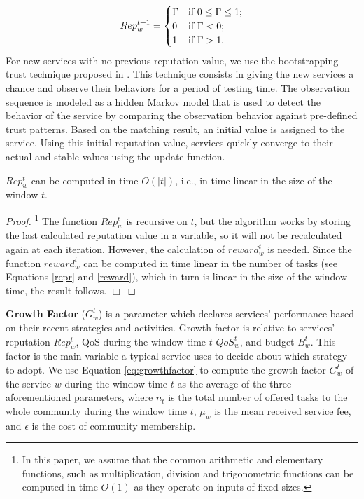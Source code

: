 \begin{equation}\label{repz}
Rep_{w}^{t+1} = \begin{cases}

\Gamma & \text{if $ 0 \leq \Gamma \leq 1$;}\\
0  & \text{if $\Gamma < 0$;}\\
1 & \text{if $\Gamma > 1$.}\\
\end{cases}
\end{equation}
%
For new services with no previous reputation value, we use the
bootstrapping trust technique proposed in \cite{DBLP:conf/icwe/YahyaouiZ11}. This
technique consists in giving the new services a chance and observe
their behaviors for a period of testing time. The observation
sequence is modeled as a hidden Markov model that is used to
detect the behavior of the service by comparing the observation
behavior against pre-defined trust patterns. Based on the matching
result, an initial value is assigned to the service. Using this
initial reputation value, services quickly converge to their
actual and stable values using the update function.

\begin{proposition}\label{Complexity-Rep}
$Rep_{w}^{t}$ can be computed in time $O(|t|)$, i.e., in time
linear in the size of the window $t$.
\end{proposition}

\begin{proof}\footnote{In this paper, we
assume that the common arithmetic and elementary functions, such
as multiplication, division and trigonometric functions can be
computed in time $O(1)$ as they operate on inputs of fixed sizes.}
The function $Rep_{w}^{t}$ is recursive on $t$, but the algorithm
works by storing the last calculated reputation value in a
variable, so it will not be recalculated again at each iteration.
However, the calculation of $reward_w^t$ is needed. Since the
function $reward_w^t$ can be computed in time linear in the number
of tasks (see Equations \ref{repr} and \ref{reward}), which in
turn is linear in the size of the window time, the result follows.
$\Box$
\end{proof}

\textbf{Growth Factor} ($G_w^t$) is a parameter which declares
services' performance based on their recent strategies and
activities. Growth factor is relative to services' reputation
$Rep_w^t$, QoS during the window time $t$ $QoS_w^t$, and budget
$B_w^t$. This factor is the main variable a typical service uses
to decide about which strategy to adopt. We use Equation \ref{eq:growthfactor} to compute the
growth factor $G^t_w$ of the service $w$ during the window time
$t$ as the average of the three aforementioned parameters, where
$n_t$ is the total number of offered tasks to the whole community
during the
window time $t$, %
$\mu_w$ is the mean received service fee, and $\epsilon$ is the
cost of community membership.

